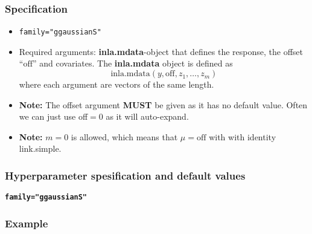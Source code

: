 \documentclass[a4paper,11pt]{article}
\begin{document}
\subsubsection*{Specification}
\begin{itemize}
\item \texttt{family="ggaussianS"}
\item Required arguments: \textbf{inla.mdata}-object that defines the
    response, the offset ``$\text{off}$'' and covariates. The
    \textbf{inla.mdata} object is defined as
    \begin{displaymath}
        \text{inla.mdata}(y, \text{off}, z_1, \ldots, z_m)
    \end{displaymath}
    where each argument are vectors of the same length.
\item \textbf{Note:} The offset argument \textbf{MUST} be given as it
    has no default value. Often we can just use off$=0$ as it will
    auto-expand.
\item \textbf{Note:} $m=0$ is allowed, which means that
    $\mu=\text{off}$ with with identity link.simple.
\end{itemize}

\subsubsection*{Hyperparameter spesification and default values}
\textbf{\texttt{family="ggaussianS"}}


\subsubsection*{Example}

\end{document}

